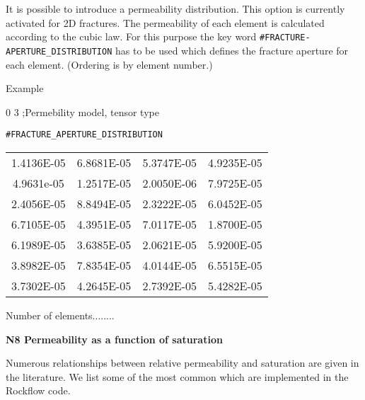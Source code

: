 It is possible to introduce a permeability distribution. This
option is currently activated for 2D fractures. The permeability
of each element is calculated according to the cubic law. For this
purpose the key word \verb+#FRACTURE-APERTURE_DISTRIBUTION+ has to
be used which defines the fracture aperture for each element.
(Ordering is by element number.)

Example

0 3 ;Permebility model, tensor type

\begin{verbatim}
#FRACTURE_APERTURE_DISTRIBUTION
\end{verbatim}

\begin{tabular}{c c c c}

1.4136E-05  &   6.8681E-05  &   5.3747E-05  &   4.9235E-05\\
4.9631e-05  &   1.2517E-05  &   2.0050E-06  &   7.9725E-05\\
2.4056E-05  &   8.8494E-05  &   2.3222E-05  &   6.0452E-05\\
6.7105E-05  &   4.3951E-05  &   7.0117E-05  &   1.8700E-05\\
6.1989E-05  &   3.6385E-05  &   2.0621E-05  &   5.9200E-05\\
3.8982E-05  &   7.8354E-05  &   4.0144E-05  &   6.5515E-05\\
3.7302E-05  &   4.2645E-05  &   2.7392E-05  &   5.4282E-05\\
\end{tabular}

\vspace{0.5cm}

Number of elements........

\vspace{0.5cm}
\newpage
\textbf{N8  Permeability as a function of saturation }

\vspace{0.5cm}


Numerous relationships between relative permeability and
saturation are given in the literature. We list some of the most
common which are implemented in the Rockflow code.

